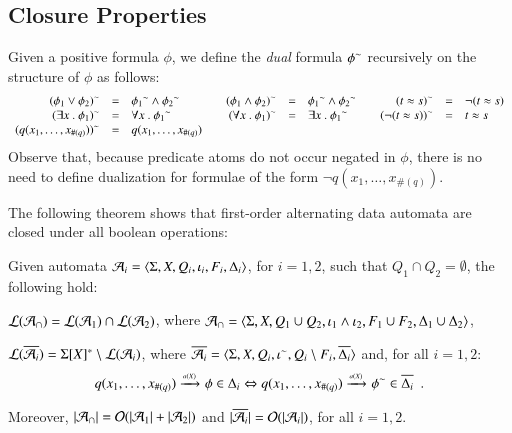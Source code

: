 \documentclass{llncs}
\begin{document}
\subsection{Closure Properties}

Given a positive formula $\phi$, we define the \emph{dual} formula
${\phi}^{\sim}$ recursively on the structure of $\phi$ as follows: 
\[\begin{array}{rclcrclcrcl}
{(\phi_1 \vee \phi_2)}^{\sim} & = & {\phi_1}^{\sim} \wedge {\phi_2}^{\sim} && 
{(\phi_1 \wedge \phi_2)}^{\sim} & = & {\phi_1}^{\sim} \wedge {\phi_2}^{\sim} &&
{(t \approx s)}^{\sim} & = & \neg(t \approx s) \\
{(\exists x ~.~ \phi_1)}^{\sim} & = & \forall x ~.~ {\phi_1}^{\sim} && 
{(\forall x ~.~ \phi_1)}^{\sim} & = & \exists x ~.~ {\phi_1}^{\sim} && 
{(\neg(t \approx s))}^{\sim} & = & t \approx s \\
{(q(x_1,\ldots,x_{\#(q)}))}^{\sim} & = & q(x_1,\ldots,x_{\#(q)})
\end{array}\]
Observe that, because predicate atoms do not occur negated in $\phi$,
there is no need to define dualization for formulae of the form $\neg
q(x_1,\ldots,x_{\#(q)})$. 


The following theorem shows that first-order alternating data automata
are closed under all boolean operations: 

\begin{theorem}\label{thm:closure}
  Given automata $\mathcal{A}_i = \langle \Sigma,X,Q_i,\iota_i,F_i,\Delta_i \rangle$,
  for $i=1,2$, such that $Q_1 \cap Q_2 = \emptyset$, the following hold: 
  \begin{compactitem}
    \item\label{it1:closure} ${\mathcal L}({\mathcal{A}_\cap}) = {\mathcal L}({\mathcal{A}_1}) \cap {\mathcal L}({\mathcal{A}_2})$, where
      $\mathcal{A}_\cap = \langle \Sigma,X,Q_1 \cup Q_2, \iota_1 \wedge \iota_2,
      F_1 \cup F_2, \Delta_1 \cup \Delta_2 \rangle$, 
    \item\label{it2:closure} ${\mathcal L}({\overline{\mathcal{A}_i}}) = \Sigma[X]^* \setminus
      {\mathcal L}({\mathcal{A}_i})$, where $\overline{\mathcal{A}_i} =
      \langle \Sigma,X,Q_i,{\iota}^{\sim},Q_i\setminus
        F_i,\overline{\Delta_i} \rangle$ and, for all
      $i=1,2$: \[q(x_1,\ldots,x_{\#(q)}) \xrightarrow{{\scriptscriptstyle a(X)}}_{{\scriptstyle }} \phi \in
      \Delta_i \Leftrightarrow q(x_1,\ldots,x_{\#(q)}) \xrightarrow{{\scriptscriptstyle a(X)}}_{{\scriptstyle }} {\phi}^{\sim}
      \in \overline{\Delta_i} \enspace.\]
  \end{compactitem}
  Moreover, ${|{\mathcal{A}_\cap}|} = \mathcal{O}({{|{\mathcal{A}_1}|}+{|{\mathcal{A}_2}|}})$ and
  ${|{\overline{\mathcal{A}_i}}|} = \mathcal{O}({{|{\mathcal{A}_i}|}})$, for all $i=1,2$.
\end{theorem}
\proof{\qed}

 

\end{document}
